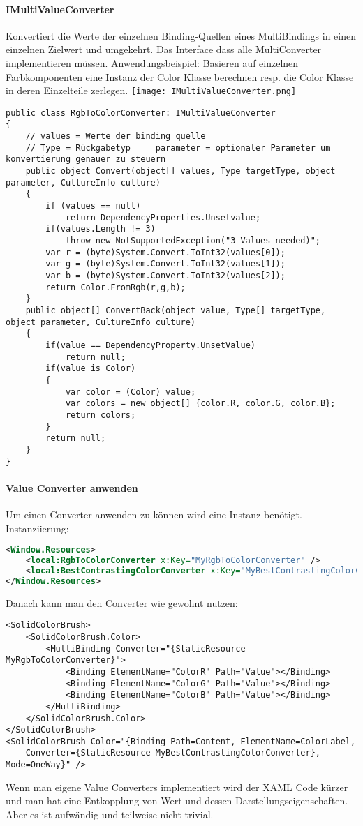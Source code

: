 \paragraph{IMultiValueConverter} Konvertiert die Werte der einzelnen Binding-Quellen eines MultiBindings in einen einzelnen Zielwert und umgekehrt. Das Interface dass alle MultiConverter implementieren müssen. Anwendungsbeispiel: Basieren auf einzelnen Farbkomponenten eine Instanz der Color Klasse berechnen resp. die Color Klasse in deren Einzelteile zerlegen.
\texttt{[image: IMultiValueConverter.png]}
\begin{lstlisting}
public class RgbToColorConverter: IMultiValueConverter
{
    // values = Werte der binding quelle  
    // Type = Rückgabetyp     parameter = optionaler Parameter um konvertierung genauer zu steuern
    public object Convert(object[] values, Type targetType, object parameter, CultureInfo culture)
    {
        if (values == null)
            return DependencyProperties.Unsetvalue;
        if(values.Length != 3)
            throw new NotSupportedException("3 Values needed)";
        var r = (byte)System.Convert.ToInt32(values[0]);
        var g = (byte)System.Convert.ToInt32(values[1]);
        var b = (byte)System.Convert.ToInt32(values[2]);
        return Color.FromRgb(r,g,b);
    }
    public object[] ConvertBack(object value, Type[] targetType, object parameter, CultureInfo culture)
    {
        if(value == DependencyProperty.UnsetValue)
            return null;
        if(value is Color)
        {
            var color = (Color) value;
            var colors = new object[] {color.R, color.G, color.B};
            return colors;
        }
        return null;
    }
}
\end{lstlisting}
\paragraph{Value Converter anwenden} Um einen Converter anwenden zu können wird eine Instanz benötigt. Instanziierung:
\begin{lstlisting}[language=xml]
<Window.Resources>
    <local:RgbToColorConverter x:Key="MyRgbToColorConverter" />
    <local:BestContrastingColorConverter x:Key="MyBestContrastingColorConverter" />
</Window.Resources>
\end{lstlisting}
Danach kann man den Converter wie gewohnt nutzen:
\begin{lstlisting}
<SolidColorBrush>
    <SolidColorBrush.Color>
        <MultiBinding Converter="{StaticResource MyRgbToColorConverter}">
            <Binding ElementName="ColorR" Path="Value"></Binding>
            <Binding ElementName="ColorG" Path="Value"></Binding>
            <Binding ElementName="ColorB" Path="Value"></Binding>
        </MultiBinding>
    </SolidColorBrush.Color>
</SolidColorBrush>
<SolidColorBrush Color="{Binding Path=Content, ElementName=ColorLabel,
    Converter={StaticResource MyBestContrastingColorConverter}, Mode=OneWay}" />
\end{lstlisting}
Wenn man eigene Value Converters implementiert wird der XAML Code kürzer und man hat eine Entkopplung von Wert und dessen Darstellungseigenschaften. Aber es ist aufwändig und teilweise nicht trivial.




